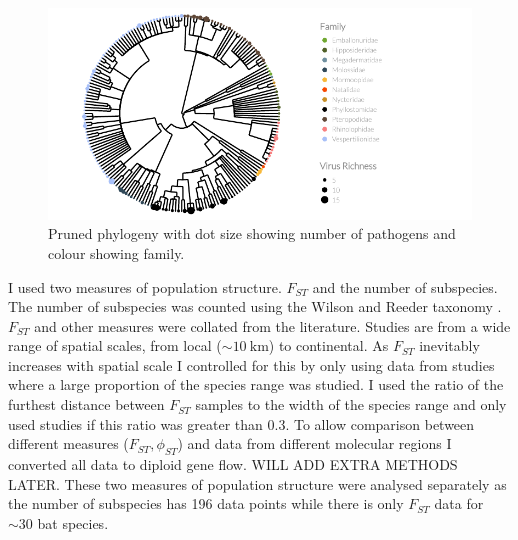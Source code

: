 \begin{knitrout}\footnotesize
{}\color{fgcolor}\begin{figure}[t]

{\centering \includegraphics[width=\textwidth]{figure/treePlot-1} 

}

\caption[Pruned phylogeny with dot size showing number of pathogens and colour showing family]{Pruned phylogeny with dot size showing number of pathogens and colour showing family.}\label{fig:treePlot}
\end{figure}


\end{knitrout}







\begin{knitrout}\footnotesize
{}\color{fgcolor}\begin{kframe}


{\ttfamily\noindent\bfseries{}}\end{kframe}
\end{knitrout}




I used two measures of population structure. 
$F_{ST}$ and the number of subspecies.
The number of subspecies was counted using the Wilson and Reeder taxonomy \cite{wilson2005mammal}.
$F_{ST}$ and other measures were collated from the literature.
Studies are from a wide range of spatial scales, from local ($\sim\SI{10}{\kilo\metre}$) to continental.
As $F_{ST}$ inevitably increases with spatial scale I controlled for this by only using data from studies where a large proportion of the species range was studied.
I used the ratio of the furthest distance between $F_{ST}$ samples to the width of the species range and only used studies if this ratio was greater than 0.3.
To allow comparison between different measures ($F_{ST}, \phi_{ST}$) and data from different molecular regions I converted all data to diploid gene flow.
WILL ADD EXTRA METHODS LATER.
These two measures of population structure were analysed separately as the number of subspecies has 196 data points while there is only $F_{ST}$ data for $\sim 30$ bat species.


